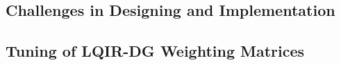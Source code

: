 \documentclass[3p]{elsarticle}
\begin{document}


\subsection{Challenges in Designing and Implementation}


\subsection{Tuning of LQIR-DG Weighting Matrices}
\end{document}
